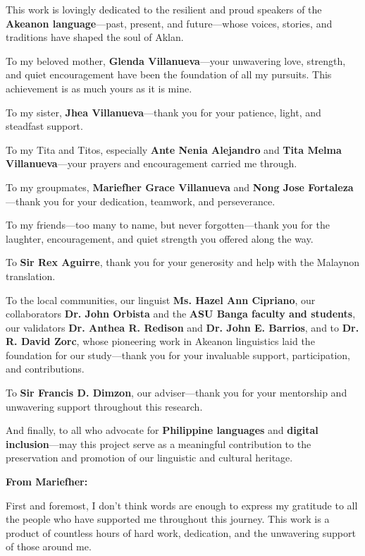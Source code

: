 This work is lovingly dedicated to the resilient and proud speakers of the \textbf{Akeanon language}—past, present, and future—whose voices, stories, and traditions have shaped the soul of Aklan.

To my beloved mother, \textbf{Glenda Villanueva}—your unwavering love, strength, and quiet encouragement have been the foundation of all my pursuits. This achievement is as much yours as it is mine.

To my sister, \textbf{Jhea Villanueva}—thank you for your patience, light, and steadfast support.

To my Tita and Titos, especially \textbf{Ante Nenia Alejandro} and \textbf{Tita Melma Villanueva}—your prayers and encouragement carried me through.

To my groupmates, \textbf{Mariefher Grace Villanueva} and \textbf{Nong Jose Fortaleza}—thank you for your dedication, teamwork, and perseverance.

To my friends—too many to name, but never forgotten—thank you for the laughter, encouragement, and quiet strength you offered along the way.

To \textbf{Sir Rex Aguirre}, thank you for your generosity and help with the Malaynon translation.

To the local communities, our linguist \textbf{Ms. Hazel Ann Cipriano}, our collaborators \textbf{Dr. John Orbista} and the \textbf{ASU Banga faculty and students}, our validators \textbf{Dr. Anthea R. Redison} and \textbf{Dr. John E. Barrios}, and to \textbf{Dr. R. David Zorc}, whose pioneering work in Akeanon linguistics laid the foundation for our study—thank you for your invaluable support, participation, and contributions.

To \textbf{Sir Francis D. Dimzon}, our adviser—thank you for your mentorship and unwavering support throughout this research.

And finally, to all who advocate for \textbf{Philippine languages} and \textbf{digital inclusion}—may this project serve as a meaningful contribution to the preservation and promotion of our linguistic and cultural heritage.

\newpage

\textbf{From Mariefher:}

First and foremost, I don't think words are enough to express my gratitude to all the people who have supported me throughout this journey. This work is a product of countless hours of hard work, dedication, and the unwavering support of those around me.

